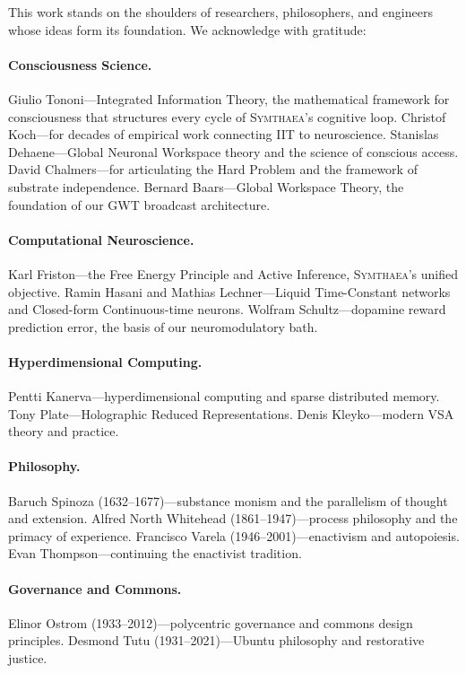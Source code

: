 \documentclass[12pt]{book}
\newcommand{\symthaea}{\textsc{Symthaea}}
\begin{document}
This work stands on the shoulders of researchers, philosophers, and engineers whose ideas form its foundation. We acknowledge with gratitude:

\paragraph{Consciousness Science.}
Giulio Tononi---Integrated Information Theory, the mathematical framework for consciousness that structures every cycle of \symthaea{}'s cognitive loop.
Christof Koch---for decades of empirical work connecting IIT to neuroscience.
Stanislas Dehaene---Global Neuronal Workspace theory and the science of conscious access.
David Chalmers---for articulating the Hard Problem and the framework of substrate independence.
Bernard Baars---Global Workspace Theory, the foundation of our GWT broadcast architecture.

\paragraph{Computational Neuroscience.}
Karl Friston---the Free Energy Principle and Active Inference, \symthaea{}'s unified objective.
Ramin Hasani and Mathias Lechner---Liquid Time-Constant networks and Closed-form Continuous-time neurons.
Wolfram Schultz---dopamine reward prediction error, the basis of our neuromodulatory bath.

\paragraph{Hyperdimensional Computing.}
Pentti Kanerva---hyperdimensional computing and sparse distributed memory.
Tony Plate---Holographic Reduced Representations.
Denis Kleyko---modern VSA theory and practice.

\paragraph{Philosophy.}
Baruch Spinoza (1632--1677)---substance monism and the parallelism of thought and extension.
Alfred North Whitehead (1861--1947)---process philosophy and the primacy of experience.
Francisco Varela (1946--2001)---enactivism and autopoiesis.
Evan Thompson---continuing the enactivist tradition.

\paragraph{Governance and Commons.}
Elinor Ostrom (1933--2012)---polycentric governance and commons design principles.
Desmond Tutu (1931--2021)---Ubuntu philosophy and restorative justice.
\end{document}
